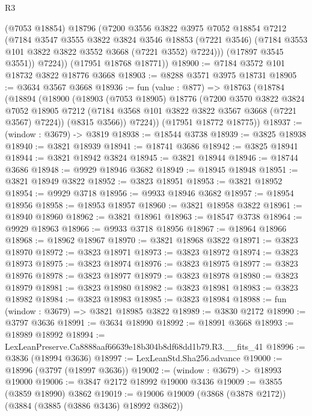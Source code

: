 \begin{lexlean}{R3}
\begin{coremodule}
            (@7053 @18854)
            @18796
            (@7200
              @3556
              @3822
              @3975
              @7052
              @18854
              @7212
              (@7184
                @3547
                @3555
                @3822
                @3824
                @3546
                @18853
                (@7221 @3546)
                (@7184 @3553 @101 @3822 @3822 @3552 @3668 (@7221 @3552) @7224)))
            (@17897 @3545 @3551))
          @7224))
      (@17951 @18768 @18771))
@18900 := @7184 @3572 @101 @18732 @3822 @18776 @3668
@18903 := @8288 @3571 @3975 @18731
@18905 := @3634 @3567 @3668
@18936 := fun (value : @877) =>
  @18763
    (@18784
      (@18894
        (@18900
          (@18903
            (@7053 @18905)
            @18776
            (@7200
              @3570
              @3822
              @3824
              @7052
              @18905
              @7212
              (@7184 @3568 @101 @3822 @3822 @3567 @3668 (@7221 @3567) @7224))
            (@8315 @3566))
          @7224))
      (@17951 @18772 @18775))
@18937 := (window : @3679) -> @3819
@18938 := @18544 @3738
@18939 := @3825 @18938
@18940 := @3821 @18939
@18941 := @18741 @3686
@18942 := @3825 @18941
@18944 := @3821 @18942 @3824
@18945 := @3821 @18944
@18946 := @18744 @3686
@18948 := @9929 @18946 @3682
@18949 := @18945 @18948
@18951 := @3821 @18949 @3822
@18952 := @3823 @18951
@18953 := @3821 @18952
@18954 := @9929 @3718
@18956 := @9933 @18946 @3682
@18957 := @18954 @18956
@18958 := @18953 @18957
@18960 := @3821 @18958 @3822
@18961 := @18940 @18960
@18962 := @3821 @18961
@18963 := @18547 @3738
@18964 := @9929 @18963
@18966 := @9933 @3718 @18956
@18967 := @18964 @18966
@18968 := @18962 @18967
@18970 := @3821 @18968 @3822
@18971 := @3823 @18970
@18972 := @3823 @18971
@18973 := @3823 @18972
@18974 := @3823 @18973
@18975 := @3823 @18974
@18976 := @3823 @18975
@18977 := @3823 @18976
@18978 := @3823 @18977
@18979 := @3823 @18978
@18980 := @3823 @18979
@18981 := @3823 @18980
@18982 := @3823 @18981
@18983 := @3823 @18982
@18984 := @3823 @18983
@18985 := @3823 @18984
@18988 := fun (window : @3679) => @3821 @18985 @3822
@18989 := @3830 @2172
@18990 := @3797 @3636
@18991 := @3634 @18990
@18992 := @18991 @3668
@18993 := @18989 @18992
@18994 := LexLeanPreserve.Ca8888aaf66639e18b304b8df68dd1b79.R3.__fits_41
@18996 := @3836 (@18994 @3636)
@18997 := LexLeanStd.Sha256.advance
@19000 := @18996 (@3797 (@18997 @3636))
@19002 := (window : @3679) -> @18993 @19000
@19006 := @3847 @2172 @18992 @19000 @3436
@19009 := @3855 (@3859 @18990) @3862
@19019 := @19006 @19009 (@3868 (@3878 @2172)) (@3884 (@3885 (@3886 @3436) @18992 @3862))

\end{coremodule}
\end{lexlean}
